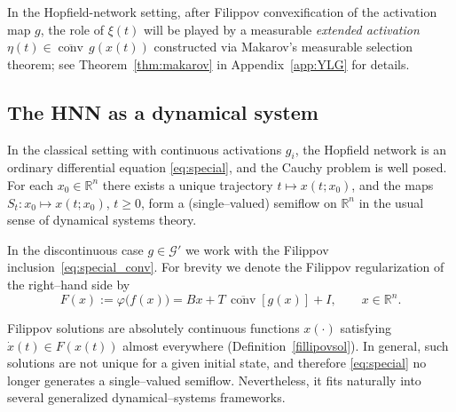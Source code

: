 \documentclass[journal]{IEEEtran}
\begin{document}
In the Hopfield-network setting, after Filippov convexification of the
activation map $g$, the role of $\xi(t)$ will be played by a measurable
\emph{extended activation} $\eta(t)\in\overline{\operatorname{conv}}\,g(x(t))$
constructed via Makarov's measurable selection theorem; 
see Theorem~\ref{thm:makarov} in Appendix~\ref{app:YLG} for details.


\subsection{The HNN as a dynamical system}\label{subsec:HNN-dyn-sys}

In the classical setting with continuous activations $g_i$, the
Hopfield network is an ordinary differential
equation \eqref{eq:special}, 
and the Cauchy problem is well posed. For each $x_0\in\mathbb{R}^n$
there exists a unique trajectory $t\mapsto x(t;x_0)$, and the maps
$S_t:x_0\mapsto x(t;x_0)$, $t\ge0$, form a (single–valued) semiflow on
$\mathbb{R}^n$ in the usual sense of dynamical systems theory.

In the discontinuous case $g\in\mathcal{G'}$ we work with the Filippov
inclusion~\eqref{eq:special_conv}. For brevity we denote the Filippov
regularization of the right–hand side by
\begin{equation}\label{eq:F-filippov}
   F(x)
   := \varphi\bigl(f(x)\bigr)
   = Bx + T\,\overline{\operatorname{conv}}[g(x)] + I,
   \qquad x\in\mathbb{R}^n.
\end{equation}

Filippov solutions are absolutely continuous functions $x(\cdot)$
satisfying $\dot x(t)\in F(x(t))$ almost everywhere
(Definition~\ref{fillipovsol}). In general, such solutions are not
unique for a given initial state, and therefore \eqref{eq:special} no
longer generates a single–valued semiflow. Nevertheless, it fits
naturally into several generalized dynamical–systems frameworks.

\smallskip
\end{document}
